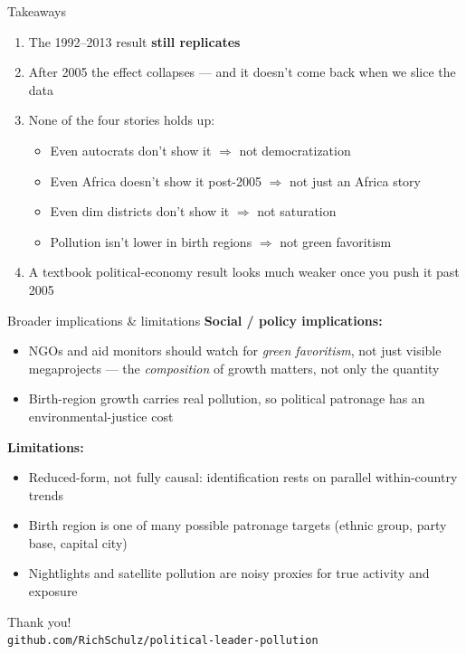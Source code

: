 \documentclass[aspectratio=169, 11pt]{beamer}
\begin{document}
\begin{frame}{Takeaways}
    \begin{enumerate}
        \item The 1992--2013 result \textbf{still replicates}
        \item After 2005 the effect collapses --- and it doesn't come back when we slice the data
        \item None of the four stories holds up:
            \begin{itemize}
                \item Even autocrats don't show it $\Rightarrow$ not democratization
                \item Even Africa doesn't show it post-2005 $\Rightarrow$ not just an Africa story
                \item Even dim districts don't show it $\Rightarrow$ not saturation
                \item Pollution isn't lower in birth regions $\Rightarrow$ not green favoritism
            \end{itemize}
        \item A textbook political-economy result looks much weaker once you push it past 2005
    \end{enumerate}
\end{frame}

\begin{frame}{Broader implications \& limitations}
    \textbf{Social / policy implications:}
    \begin{itemize}
        \item NGOs and aid monitors should watch for \emph{green favoritism}, not just visible megaprojects --- the \emph{composition} of growth matters, not only the quantity
        \item Birth-region growth carries real pollution, so political patronage has an environmental-justice cost
    \end{itemize}

    \vspace{0.6em}
    \textbf{Limitations:}
    \begin{itemize}
        \item Reduced-form, not fully causal: identification rests on parallel within-country trends
        \item Birth region is one of many possible patronage targets (ethnic group, party base, capital city)
        \item Nightlights and satellite pollution are noisy proxies for true activity and exposure
    \end{itemize}

    \vspace{0.8em}
    \begin{center}
        \Large Thank you! \\[0.3em]
        \footnotesize \texttt{github.com/RichSchulz/political-leader-pollution}
    \end{center}
\end{frame}
\end{document}
